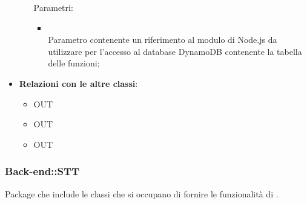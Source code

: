 \begin{itemize}
\begin{itemize}
		Parametri:
		\begin{itemize}
			\item {} \\
			Parametro contenente un riferimento al modulo di Node.js da utilizzare per l'accesso al database DynamoDB contenente la tabella delle funzioni;
		\end{itemize}
	\end{itemize}
	\item \textbf{Relazioni con le altre classi}:
	\begin{itemize}
		\item OUT \hyperlink{Task_label}{}
		\item OUT \hyperlink{TaskObservable_label}{}
		\item OUT \hyperlink{ErrorObservable_label}{}
	\end{itemize}
\end{itemize}
\FloatBarrier

\subsubsection{Back-end::STT}
Package che include le classi che si occupano di fornire le funzionalità di .

